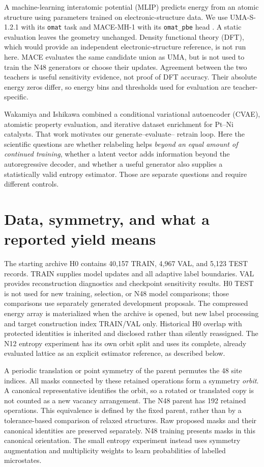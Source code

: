 \documentclass[11pt]{article}
\begin{document}
A machine-learning interatomic potential (MLIP) predicts energy from an
atomic structure using parameters trained on electronic-structure data. We
use UMA-S-1.2.1 with its \texttt{omat} task \cite{uma} and MACE-MH-1 with its
\texttt{omat\_pbe} head \cite{macefoundation}. A static evaluation leaves the geometry unchanged.
Density functional theory (DFT), which would provide an independent
electronic-structure reference, is not run here. MACE evaluates the same
candidate union as UMA, but is not used to train the N48 generators or choose
their updates. Agreement between the two teachers is useful sensitivity
evidence, not proof of DFT accuracy. Their absolute energy zeros differ, so
energy bins and thresholds used for evaluation are teacher-specific.

Wakamiya and Ishikawa \cite{wakamiya} combined a conditional variational
autoencoder (CVAE), atomistic property evaluation, and iterative dataset
enrichment for Pt--Ni catalysts. That work motivates our generate--evaluate--
retrain loop. Here the scientific questions are whether relabeling helps
\emph{beyond an equal amount of continued training}, whether a latent vector
adds information beyond the autoregressive decoder, and whether a useful
generator also supplies a statistically valid entropy estimator. Those are
separate questions and require different controls.

\section{Data, symmetry, and what a reported yield means}
The starting archive H0 contains 40,157 TRAIN, 4,967 VAL, and 5,123 TEST
records. TRAIN supplies model updates and all adaptive label boundaries. VAL
provides reconstruction diagnostics and checkpoint sensitivity results. H0
TEST is not used for new training, selection, or N48 model comparisons;
those comparisons use separately generated development proposals.
The compressed energy array is materialized when the archive is opened, but
new label processing and target construction index TRAIN/VAL only. Historical
H0 overlap with protected identities is inherited and disclosed rather than
silently reassigned. The N12 entropy experiment has its own orbit split and
uses its complete, already evaluated lattice as an explicit estimator
reference, as described below.

A periodic translation or point symmetry of the parent permutes the 48 site
indices. All masks connected by these retained operations form a symmetry
\emph{orbit}. A canonical representative identifies the orbit, so a rotated
or translated copy is not counted as a new vacancy arrangement. The N48
parent has 192 retained operations. This equivalence is defined by the fixed
parent, rather than by a tolerance-based comparison of relaxed structures.
Raw proposed masks and their canonical identities are preserved separately.
N48 training presents masks in this canonical orientation. The small entropy
experiment instead uses symmetry augmentation and multiplicity weights to
learn probabilities of labelled microstates.
\end{document}
